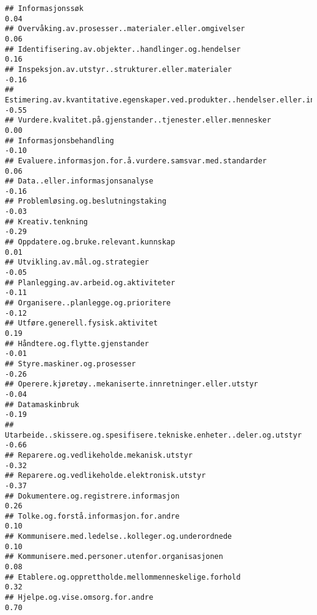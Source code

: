\documentclass[
]{article}
\begin{document}
\begin{verbatim}
## Informasjonssøk                                                                   0.04
## Overvåking.av.prosesser..materialer.eller.omgivelser                              0.06
## Identifisering.av.objekter..handlinger.og.hendelser                               0.16
## Inspeksjon.av.utstyr..strukturer.eller.materialer                                -0.16
## Estimering.av.kvantitative.egenskaper.ved.produkter..hendelser.eller.informasjon -0.55
## Vurdere.kvalitet.på.gjenstander..tjenester.eller.mennesker                        0.00
## Informasjonsbehandling                                                           -0.10
## Evaluere.informasjon.for.å.vurdere.samsvar.med.standarder                         0.06
## Data..eller.informasjonsanalyse                                                  -0.16
## Problemløsing.og.beslutningstaking                                               -0.03
## Kreativ.tenkning                                                                 -0.29
## Oppdatere.og.bruke.relevant.kunnskap                                              0.01
## Utvikling.av.mål.og.strategier                                                   -0.05
## Planlegging.av.arbeid.og.aktiviteter                                             -0.11
## Organisere..planlegge.og.prioritere                                              -0.12
## Utføre.generell.fysisk.aktivitet                                                  0.19
## Håndtere.og.flytte.gjenstander                                                   -0.01
## Styre.maskiner.og.prosesser                                                      -0.26
## Operere.kjøretøy..mekaniserte.innretninger.eller.utstyr                          -0.04
## Datamaskinbruk                                                                   -0.19
## Utarbeide..skissere.og.spesifisere.tekniske.enheter..deler.og.utstyr             -0.66
## Reparere.og.vedlikeholde.mekanisk.utstyr                                         -0.32
## Reparere.og.vedlikeholde.elektronisk.utstyr                                      -0.37
## Dokumentere.og.registrere.informasjon                                             0.26
## Tolke.og.forstå.informasjon.for.andre                                             0.10
## Kommunisere.med.ledelse..kolleger.og.underordnede                                 0.10
## Kommunisere.med.personer.utenfor.organisasjonen                                   0.08
## Etablere.og.opprettholde.mellommenneskelige.forhold                               0.32
## Hjelpe.og.vise.omsorg.for.andre                                                   0.70

\end{verbatim}
\end{document}
